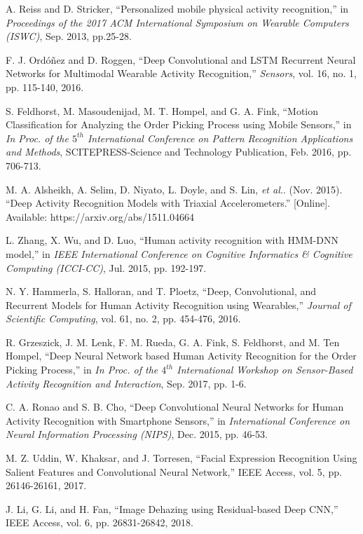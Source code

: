 \documentclass[twoside,twocolumn]{article}
\begin{document}
\begin{thebibliography}{00}
 A. Reiss and D. Stricker, ``Personalized mobile physical activity recognition,'' in \emph{Proceedings of the 2017 ACM International Symposium on Wearable Computers (ISWC)}, Sep. 2013, pp.25-28.

 F. J. Ord\'o\~nez and D. Roggen, ``Deep Convolutional and LSTM Recurrent Neural Networks for Multimodal Wearable Activity Recognition,'' \emph{Sensors}, vol. 16, no. 1, pp. 115-140, 2016.

 S. Feldhorst, M. Masoudenijad, M. T. Hompel, and G. A. Fink, ``Motion Classification for Analyzing the Order Picking Process using Mobile Sensors,'' in \emph{In Proc. of the $5^{th}$ International Conference on Pattern Recognition Applications and Methods}, SCITEPRESS-Science and Technology Publication, Feb. 2016, pp. 706-713.

 M. A. Alsheikh, A. Selim, D. Niyato, L. Doyle, and S. Lin, \emph{et al.}. (Nov. 2015). ``Deep Activity Recognition Models with Triaxial Accelerometers.'' [Online]. Available: https://arxiv.org/abs/1511.04664

 L. Zhang, X. Wu, and D. Luo, ``Human activity recognition with {HMM-DNN} model,'' in \emph{IEEE International Conference on Cognitive Informatics \& Cognitive Computing (ICCI-CC)}, Jul. 2015, pp. 192-197.

 N. Y. Hammerla, S. Halloran, and T. Ploetz, ``Deep, Convolutional, and Recurrent Models for Human Activity Recognition using Wearables,'' \emph{Journal of Scientific Computing}, vol. 61, no. 2, pp. 454-476, 2016.

 R. Grzeszick, J. M. Lenk, F. M. Rueda, G. A. Fink, S. Feldhorst, and M. Ten Hompel, ``Deep Neural Network based Human Activity Recognition for the Order Picking Process,'' in \emph{In Proc. of the $4^{th}$ International Workshop on Sensor-Based Activity Recognition and Interaction}, Sep. 2017, pp. 1-6.

 C. A. Ronao and S. B. Cho, ``Deep Convolutional Neural Networks for Human Activity Recognition with Smartphone Sensors,'' in \emph{ International Conference on Neural Information Processing (NIPS)}, Dec. 2015, pp. 46-53.

 M. Z. Uddin, W. Khaksar, and J. Torresen, ``Facial Expression Recognition Using Salient Features and Convolutional Neural Network,'' IEEE Access, vol. 5, pp. 26146-26161, 2017.

 J. Li, G. Li, and H. Fan, ``Image Dehazing using Residual-based Deep CNN,'' IEEE Access, vol. 6, pp. 26831-26842, 2018.


\end{thebibliography}
\end{document}
